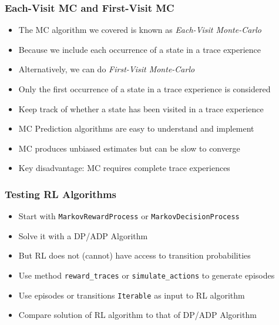 \documentclass[handout]{beamer}
\begin{document}
\begin{frame}
\frametitle{Each-Visit MC and First-Visit MC}
\pause
\begin{itemize}[<+->]
\item The MC algorithm we covered is known as {\em Each-Visit Monte-Carlo}
\item Because we include each occurrence of a state in a trace experience
\item Alternatively, we can do {\em First-Visit Monte-Carlo}
\item  Only the first occurrence of a state in a trace experience is considered
\item  Keep track of whether a state has been visited in a trace experience
\item MC Prediction algorithms are easy to understand and implement
\item MC produces unbiased estimates but can be slow to converge
\item Key disadvantage: MC requires complete trace experiences
\end{itemize}
\end{frame}

\begin{frame}
\frametitle{Testing RL Algorithms}
\pause
\begin{itemize}[<+->]
\item Start with \lstinline{MarkovRewardProcess} or \lstinline{MarkovDecisionProcess}
\item Solve it with a DP/ADP Algorithm
\item But RL does not (cannot) have access to transition probabilities
\item Use method \lstinline{reward_traces} or \lstinline{simulate_actions} to generate episodes
\item Use episodes or transitions \lstinline{Iterable} as input to RL algorithm
\item Compare solution of RL algorithm to that of DP/ADP Algorithm
\end{itemize}
\end{frame}
\end{document}

